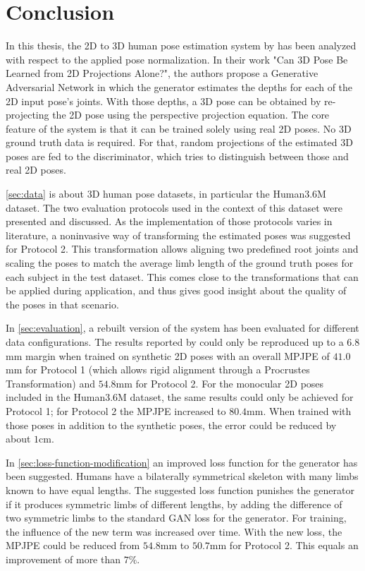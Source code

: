 \section{Conclusion}
\label{sec:conclusion}
In this thesis, the 2D to 3D human pose estimation system by \citet{drover18} has been analyzed with respect to the applied pose normalization.
In their work "Can 3D Pose Be Learned from 2D Projections Alone?", the authors propose a Generative Adversarial Network in which the generator estimates the depths for each of the 2D input pose's joints.
With those depths, a 3D pose can be obtained by re-projecting the 2D pose using the perspective projection equation.
The core feature of the system is that it can be trained solely using real 2D poses.
No 3D ground truth data is required.
For that, random projections of the estimated 3D poses are fed to the discriminator, which tries to distinguish between those and real 2D poses.

\autoref{sec:data} is about 3D human pose datasets, in particular the Human3.6M \cite{ionescu14} dataset.
The two evaluation protocols used in the context of this dataset were presented and discussed.
As the implementation of those protocols varies in literature, a noninvasive way of transforming the estimated poses was suggested for Protocol 2.
This transformation allows aligning two predefined root joints and scaling the poses to match the average limb length of the ground truth poses for each subject in the test dataset.
This comes close to the transformations that can be applied during application, and thus gives good insight about the quality of the poses in that scenario.

In \autoref{sec:evaluation}, a rebuilt version of the system has been evaluated for different data configurations.
The results reported by \citet{drover18} could only be reproduced up to a $6.8$mm margin when trained on synthetic 2D poses with an overall MPJPE of $41.0$mm for Protocol 1 (which allows rigid alignment through a Procrustes Transformation) and $54.8$mm for Protocol 2.
For the monocular 2D poses included in the Human3.6M dataset, the same results could only be achieved for Protocol 1; for Protocol 2 the MPJPE increased to $80.4$mm.
When trained with those poses in addition to the synthetic poses, the error could be reduced by about $1$cm.

In \autoref{sec:loss-function-modification} an improved loss function for the generator has been suggested.
Humans have a bilaterally symmetrical skeleton with many limbs known to have equal lengths.
The suggested loss function punishes the generator if it produces symmetric limbs of different lengths, by adding the difference of two symmetric limbs to the standard GAN loss for the generator.
For training, the influence of the new term was increased over time.
With the new loss, the MPJPE could be reduced from $54.8$mm to $50.7$mm for Protocol 2.
This equals an improvement of more than $7\%$.


